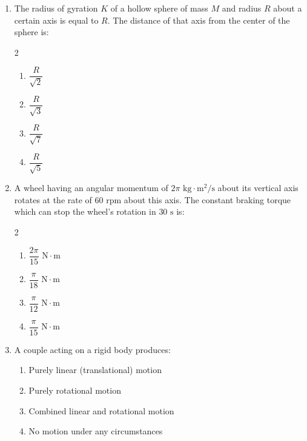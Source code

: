 \documentclass[11pt,a4paper]{article}
\begin{document}
\begin{enumerate}[label=\textbf{Q\arabic*.},leftmargin=24pt,itemsep=12pt]
  \item The radius of gyration $K$ of a hollow sphere of mass $M$ and radius $R$ about a certain axis is equal to $R$. The distance of that axis from the center of the sphere is:
  \begin{multicols}{2}
  \begin{enumerate}[label=(\Alph*),itemsep=2pt]
    \item $\dfrac{R}{\sqrt{2}}$
    \item $\dfrac{R}{\sqrt{3}}$
    \item $\dfrac{R}{\sqrt{7}}$
    \item $\dfrac{R}{\sqrt{5}}$
  \end{enumerate}
  \end{multicols}

  \item A wheel having an angular momentum of $2\pi\text{ kg}\cdot\text{m}^2/\text{s}$ about its vertical axis rotates at the rate of $60\text{ rpm}$ about this axis. The constant braking torque which can stop the wheel's rotation in $30\text{ s}$ is:
  \begin{multicols}{2}
  \begin{enumerate}[label=(\Alph*),itemsep=2pt]
    \item $\dfrac{2\pi}{15}\text{ N}\cdot\text{m}$
    \item $\dfrac{\pi}{18}\text{ N}\cdot\text{m}$
    \item $\dfrac{\pi}{12}\text{ N}\cdot\text{m}$
    \item $\dfrac{\pi}{15}\text{ N}\cdot\text{m}$
  \end{enumerate}
  \end{multicols}

  \item A couple acting on a rigid body produces:
  \begin{enumerate}[label=(\Alph*),itemsep=2pt]
    \item Purely linear (translational) motion
    \item Purely rotational motion
    \item Combined linear and rotational motion
    \item No motion under any circumstances
  \end{enumerate}


\end{enumerate}
\end{document}
